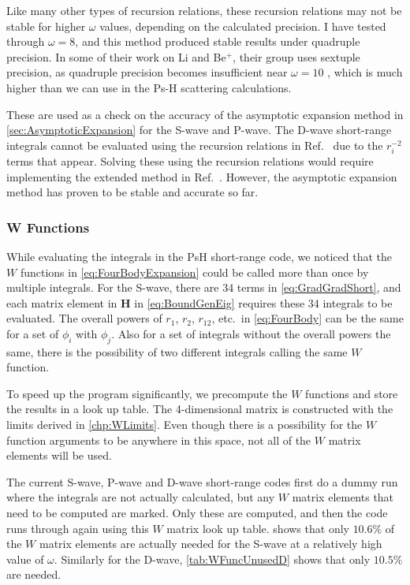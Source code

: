 \documentclass[Dissertation.tex]{subfiles}
\begin{document}
Like many other types of recursion relations, these recursion relations may 
not be stable for higher $\omega$ values, depending on the calculated 
precision. I have tested through $\omega = 8$, and this method produced 
stable results under quadruple precision. In some of their work on Li and
Be$^+$, their group uses sextuple precision, as quadruple precision becomes 
insufficient near $\omega = 10$ \cite{Puchalski2006}, which is much higher 
than we can use in the Ps-H scattering calculations.

These are used as a check on the accuracy of the asymptotic expansion method in
\cref{sec:AsymptoticExpansion} for the S-wave and P-wave. The D-wave short-range
integrals cannot be evaluated using the recursion relations in
Ref.~\cite{Pachucki2004} due to the $r_i^{-2}$ terms that appear. Solving these
using the recursion relations would require implementing the extended method in
Ref.~\cite{Pachucki2005}. However, the asymptotic expansion method has proven
to be stable and accurate so far.


\subsubsection{W Functions}
\label{sec:WFunctions}

While evaluating the integrals in the PsH short-range code, we noticed that the
$W$ functions in \cref{eq:FourBodyExpansion} could be called more than once by
multiple integrals. For the S-wave, there are 34 terms in \cref{eq:GradGradShort},
and each matrix element in \textbf{H} in \cref{eq:BoundGenEig} requires these 34
integrals to be evaluated. The overall powers of $r_1$, $r_2$, $r_{12}$, etc.\ in
\cref{eq:FourBody} can be the same for a set of $\phi_i$ with $\phi_j$. Also for a
set of integrals without the overall powers the same, there is the possibility of
two different integrals calling the same $W$ function.

To speed up the program significantly, we precompute the $W$ functions and store
the results in a look up table. The 4-dimensional matrix is constructed with the
limits derived in \cref{chp:WLimits}. Even though there is a possibility for the
$W$ function arguments to be anywhere in this space, not all of the $W$ matrix
elements will be used.

The current S-wave, P-wave and D-wave short-range codes first do a dummy run
where the integrals are not actually calculated, but any $W$ matrix elements
that need to be computed are marked. Only these are computed, and then the code
runs through again using this $W$ matrix look up table. 
shows that only $10.6\%$ of the $W$ matrix elements are actually needed for the
S-wave at a relatively high value of $\omega$. Similarly for the D-wave,
\cref{tab:WFuncUnusedD} shows that only $10.5\%$ are needed.
\end{document}
